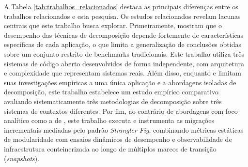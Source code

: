 A Tabela \ref{tab:trabalhos_relacionados} destaca as principais diferenças entre os trabalhos relacionados e esta pesquisa. Os estudos relacionados revelam lacunas centrais que este trabalho busca explorar. Primeiramente, \textcite{wang2024} mostram que o desempenho das técnicas de decomposição depende fortemente de características específicas de cada aplicação, o que limita a generalização de conclusões obtidas sobre um conjunto restrito de benchmarks tradicionais. Este trabalho utiliza três sistemas de código aberto desenvolvidos de forma independente, com arquitetura e complexidade que representam sistemas reais. Além disso, enquanto \textcite{kazanavicius2020} e \textcite{barzotto2022} limitam suas investigações empíricas a uma única aplicação e a abordagens isoladas de decomposição, este trabalho estabelece um estudo empírico comparativo avaliando sistematicamente três metodologias de decomposição sobre três sistemas de contextos diferentes. Por fim, ao contrário de abordagens com foco analítico como a de \textcite{levcovitz2016}, este trabalho executa e instrumenta as migrações incrementais mediadas pelo padrão \textit{Strangler Fig}, combinando métricas estáticas de modularidade com ensaios dinâmicos de desempenho e observabilidade de infraestrutura conteinerizada ao longo de múltiplos marcos de transição (\textit{snapshots}).
